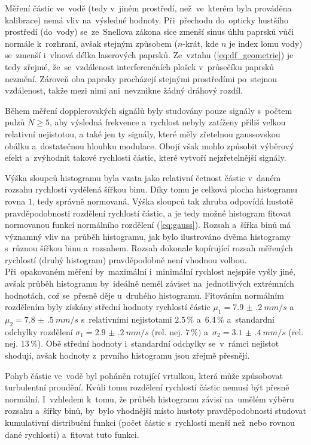 \documentclass{../concepts/titul_zprava_p/prepareprotokolZprava} %
\begin{document}
Měření částic ve~vodě (tedy v~jiném prostředí, než~ve~kterém byla prováděna kalibrace) nemá vliv na~výsledné hodnoty.
Při~přechodu do~opticky hustšího prostředí (do~vody) se~ze~Snellova zákona \cite{franc} sice zmenší sinus úhlu paprsků
vůči normále k~rozhraní, avšak stejným způsobem ($n$-krát, kde $n$ je index lomu vody) se~zmenší i~vlnová délka laserových paprsků.
Ze~vztahu (\ref{eq:df_geometrie}) je tedy zřejmé, že~se~vzdálenost interferenčních plošek v~průsečíku paprsků nezmění.
Zároveň oba paprsky procházejí stejnými prostředími po~stejnou vzdálenost, takže mezi nimi ani~nevznikne žádný dráhový rozdíl.

Během měření dopplerovských signálů byly studovány pouze signály s~počtem pulzů $N \ge 5$, aby výsledná frekvence a~rychlost
nebyly zatíženy příliš velkou relativní nejistotou, a také jen ty signály, které měly zřetelnou gaussovskou obálku a~dostatečnou
hloubku modulace. Obojí však mohlo způsobit výběrový efekt a~zvýhodnit takové rychlosti částic, které vytvoří nejzřetelnější
signály.

Výška sloupců histogramu byla vzata jako relativní četnost částic v~daném rozsahu rychlostí vydělená šířkou binu.
Díky tomu je celková plocha histogramu rovna $1$, tedy správně normovaná. Výška sloupců tak zhruba odpovídá hustotě
pravděpodobnosti rozdělení rychlostí částic, a je tedy možné histogram fitovat normovanou funkcí normálního rozdělení 
(\ref{eq:gauss}). Rozsah a~šířka binů má významný vliv na~průběh histogramu, jak bylo ilustrováno dvěma histogramy
s~různou šířkou binu a~rozsahem. Rozsah dokonale kopírující rozsah měřených rychlostí (druhý histogram) pravděpodobně není
vhodnou volbou. Při~opakovaném měření by~maximální i~minimální rychlost nejspíše vyšly jiné, avšak průběh histogramu
by~ideálně neměl záviset na~jednotlivých extrémních hodnotách, což se~přesně děje u~druhého histogramu. 
Fitováním normálním rozdělením byly získány
střední hodnoty rychlostí částic $\mu_1 = \qty{7.9(2)}{mm/s}$ a~$\mu_2 = \qty{7.8(5)}{mm/s}$ s~relativními nejistotami
$2.5\,\%$ a~$6.4\,\%$ a~standardní odchylky rozdělení
$\sigma_1 = \qty{2.9(2)}{mm/s}$ (rel. nej. $7\,\%)$ a~$\sigma_2 = \qty{3.1(4)}{mm/s}$ (rel. nej. $13\,\%$). 
Obě střední hodnoty i~standardní odchylky se~v~rámci nejistot shodují, avšak hodnoty z~prvního histogramu jsou zřejmě přesnějí.

Pohyb částic ve~vodě byl poháněn rotující vrtulkou, která může způsobovat turbulentní proudění. Kvůli tomu rozdělení rychlostí
částic nemusí být přesně normální. I~vzhledem k~tomu, že průběh histogramu závisí na~umělém výběru rozsahu a~šířky binů,
by~bylo vhodnější místo hustoty pravděpodobnosti studovat kumulativní distribuční funkci (počet částic s~rychlostí menší 
než~nebo rovnou dané rychlosti) a~fitovat tuto funkci.
\end{document}
